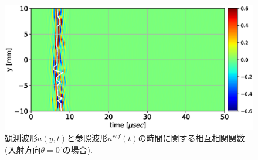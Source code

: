 \begin{figure}[h]
	\begin{center}
	\includegraphics[width=0.7\linewidth]{Figs/fig11.eps} 
	\end{center}
	\caption{
		観測波形$a(y,t)$と参照波形$a^{ref}(t)$の時間に関する相互相関関数(入射方向$\theta=0^{\circ}$の場合).
	} 
	\label{fig:fig11}
\end{figure}

